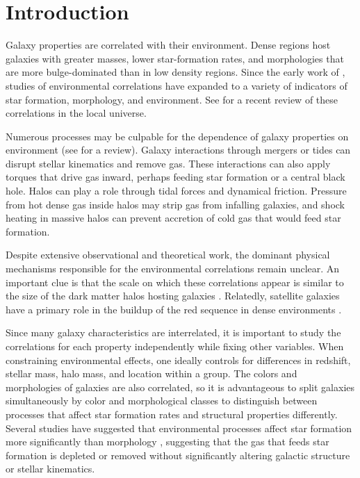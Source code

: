 \section{Introduction}

Galaxy properties are correlated with their environment. Dense regions
host galaxies with greater masses, lower star-formation rates, and
morphologies that are more bulge-dominated than in low density
regions.  Since the early work of \citet{Dressler1980}, studies of
environmental correlations have expanded to a variety of indicators of
star formation, morphology, and environment. See \citet{Blanton2009}
for a recent review of these correlations in the local universe.

Numerous processes may be culpable for the dependence of galaxy
properties on environment (see \citealt{Boselli2006} for a
review). Galaxy interactions through mergers or tides can disrupt
stellar kinematics and remove gas. These interactions can also apply
torques that drive gas inward, perhaps feeding star formation or a
central black hole. Halos can play a role through tidal forces
and dynamical friction. Pressure from hot dense gas inside halos
may strip gas from infalling galaxies, and shock heating
in massive halos can prevent accretion of cold gas that would feed
star formation.
 
Despite extensive observational and theoretical work, the dominant
physical mechanisms responsible for the environmental correlations
remain unclear.  An important clue is that the scale on which these
correlations appear is similar to the size of the dark matter halos
hosting galaxies \citep[e.g.,][]{Kauffmann2004,
  Blanton2007}. Relatedly, satellite galaxies have a primary role in
the buildup of the red sequence in dense environments
\citep[e.g.,][]{Weinmann2006, vandenBosch2008, Wetzel2012a, Peng2012}.  

Since many galaxy characteristics are interrelated, it is important to
study the correlations for each property independently while fixing
other variables. When constraining environmental effects, one ideally
controls for differences in redshift, stellar mass, halo mass, and
location within a group. The colors and morphologies of galaxies are
also correlated, so it is advantageous to split galaxies
simultaneously by color and morphological classes to distinguish
between processes that affect star formation rates and structural
properties differently. Several studies have suggested that
environmental processes affect star formation more significantly than
morphology \citep[e.g.,][]{Kauffmann2004, Blanton2005, Christlein2005,
  Weinmann2009, Kovac2010b},
suggesting that the gas that feeds star formation is depleted or
removed without significantly altering galactic structure or stellar
kinematics.

